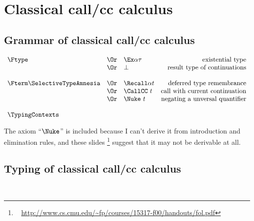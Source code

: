 \documentclass{amsart}
\begin{document}
\UniversalIntroduction

\ExistentialIntroduction

\section{Classical call/cc calculus}

\subsection{Grammar of classical call/cc calculus}

\nc{}

\[
\begin{array}{lclr}
\Ftype
&\Or& \Ex\alpha\tau & \mbox{existential type} \\
&\Or& \bot & \mbox{result type of continuations} \\
\\
\Fterm
\SelectiveTypeAmnesia
&\Or& \Recall\alpha t & \mbox{deferred type remembrance} \\
&\Or& \CallCC~t & \mbox{call with current continuation} \\
&\Or& \Nuke~t & \mbox{negating a unversal quantifier}\\
\\
\TypingContexts
\end{array}
\]

The axiom ``$\Nuke$'' is included because I can't derive it from
introduction and elimination rules, and these slides%
\footnote{~
\url{http://www.cs.cmu.edu/~fp/courses/15317-f00/handouts/fol.pdf}
}
suggest that it may not be derivable at all.

\subsection{Typing of classical call/cc calculus}
~

\nc{}

\nc{}
\end{document}
